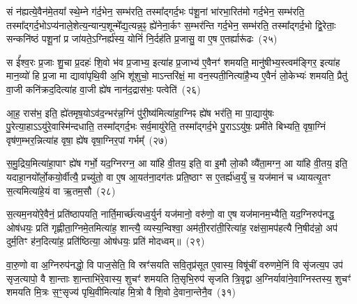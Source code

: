 सं न॑ह्यत्ये॒वैन॑मे॒तया᳚ स्थे॒म्ने ग॑र्द॒भेन॒ सम्भ॑रति॒ तस्मा᳚द्गर्द॒भः प॑शू॒नां भा॑रभा॒रित॑मो गर्द॒भेन॒ सम्भ॑रति॒ तस्मा᳚द्गर्द॒भो\-ऽप्य॑नाले॒शेत्य॒न्यान्प॒शून्मे᳚द्य॒त्यन्न॒ꣴ॒ ह्ये॑नेना॒र्कꣳ स॒म्भर॑न्ति गर्द॒भेन॒ सम्भ॑रति॒ तस्मा᳚द्गर्द॒भो द्वि॒रेताः॒ सन्कनि॑ष्ठं पशू॒नां प्र जा॑यते॒\-ऽग्निर्ह्य॑स्य॒ योनिं॑ नि॒र्दह॑ति प्र॒जासु॒ वा ए॒ष ए॒तर्\mbox{}ह्यारू॑ढः~(२५)

स ई᳚श्व॒रः प्र॒जाः शु॒चा प्र॒दहः॑ शि॒वो भ॑व प्र॒जाभ्य॒ इत्या॑ह प्र॒जाभ्य॑ ए॒वैनꣳ॑ शमयति॒ मानु॑षीभ्य॒स्त्वम॑ङ्गिर॒ इत्या॑ह मान॒व्यो॑ हि प्र॒जा मा द्यावा॑\-पृथि॒वी अ॒भि शू॑शुचो॒ माऽन्तरि॑क्षं॒ मा वन॒स्पती॒नित्या॑है॒भ्य ए॒वैनं॑ लो॒केभ्यः॑ शमयति॒ प्रैतु॑ वा॒जी कनि॑क्रद॒दित्या॑ह वा॒जी ह्ये॑ष नान॑द॒द्रास॑भः॒ पत्वेति॑~(२६)

आ॒ह॒ रास॑भ॒ इति॒ ह्ये॑तमृष॒यो\-ऽव॑द॒न्भर॑न्न॒ग्निं पु॑री॒ष्य॑मित्या॑हा॒ग्निꣴ ह्ये॑ष भर॑ति॒ मा पा॒द्यायु॑षः पु॒रेत्या॒हा\-ऽऽ\-यु॑रे॒वास्मि॑न्दधाति॒ तस्मा᳚द्गर्द॒भः सर्व॒मायु॑रेति॒ तस्मा᳚द्गर्द॒भे पु॒रा\-ऽऽ\-यु॑षः॒ प्रमी॑ते बिभ्यति॒ वृषा॒ग्निं वृष॑ण॒म्भर॒न्नित्या॑ह वृषा॒ ह्ये॑ष वृषा॒ग्निर॒पां गर्भम्᳚~(२७)

स॒मु॒द्रिय॒मित्या॑हा॒पाꣳ ह्ये॑ष गर्भो॒ यद॒ग्निरग्न॒ आ या॑हि वी॒तय॒ इति॒ वा इ॒मौ लो॒कौ व्यै॑ता॒मग्न॒ आ या॑हि वी॒तय॒ इति॒ यदाहा॒नयो᳚र्लो॒कयो॒र्वीत्यै॒ प्रच्यु॑तो॒ वा ए॒ष आ॒यत॑ना॒दग॑तः प्रति॒ष्ठाꣳ स ए॒तर्\mbox{}ह्य॑ध्व॒र्युं च॒ यज॑मानं च ध्यायत्यृ॒तꣳ स॒त्यमित्या॑हे॒यं वा ऋ॒तम॒सौ~(२८)

स॒त्यम॒नयो॑रे॒वैनं॒ प्रति॑\-ष्ठापयति॒ नार्ति॒मार्च्छ॑त्यध्व॒र्युर्न यज॑मानो॒ वरु॑णो॒ वा ए॒ष यज॑मानम॒भ्यैति॒ यद॒ग्निरुप॑नद्ध॒ ओष॑धयः॒ प्रति॑ गृह्णीता॒ग्निमे॒तमित्या॑ह॒ शान्त्यै॒ व्यस्य॒न्विश्वा॒ अम॑ती॒ररा॑ती॒रित्या॑ह॒ रक्ष॑सा॒मप॑हत्यै नि॒षीद॑न्नो॒ अप॑ दुर्म॒तिꣳ ह॑न॒दित्या॑ह॒ प्रति॑ष्ठित्या॒ ओष॑धयः॒ प्रति॑ मोदध्वम्॥~(२९)

{\anuvakamend[{अ॒स्त्व॒नु॒ष्टुब॑सि सादय॒त्यारू॑ढः॒ पत्वेति॒ गर्भ॑म॒सौ मो॑दध्वं॒ द्विच॑त्वारिꣳशच्च}]}%

{{}}

वा॒रु॒णो वा अ॒ग्निरुप॑नद्धो॒ वि पाज॒सेति॒ वि स्रꣳ॑सयति सवि॒तृप्र॑सूत ए॒वास्य॒ विषू॑चीं वरुणमे॒निं वि सृ॑जत्य॒प उप॑ सृज॒त्यापो॒ वै शा॒न्ताः शा॒न्ताभि॑रे॒वास्य॒ शुचꣳ॑ शमयति ति॒सृभि॒रुप॑ सृजति त्रि॒वृद्वा अ॒ग्निर्यावा॑ने॒वाग्निस्तस्य॒ शुचꣳ॑ शमयति मि॒त्रः स॒ꣳ॒सृज्य॑ पृथि॒वीमित्या॑ह मि॒त्रो वै शि॒वो दे॒वाना॒न्तेनै॒व~(३१)

